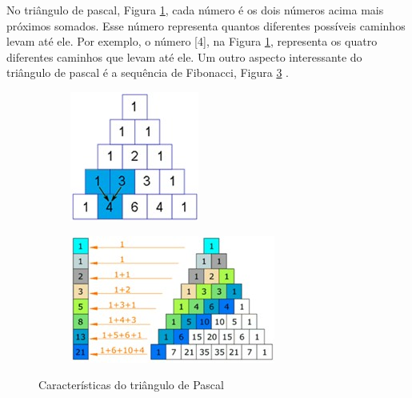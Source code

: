 No triângulo de pascal, Figura \ref{fig:pascal_triangle}, cada número é os dois números acima mais próximos somados. Esse número representa quantos diferentes possíveis caminhos levam até ele. Por exemplo, o número [4], na Figura \ref{fig:pascal_triangle}, representa os quatro diferentes caminhos que levam até ele. Um outro aspecto interessante do triângulo de pascal é a sequência de Fibonacci, Figura \ref{fig:pascal_triangle_fibonacci} \cite{mathisfun_pascal_triangle}.  

\begin{figure}[H]
\centering
	\begin{subfigure}[H]{0.47\linewidth}
	\centering
	\includegraphics[width=.55\linewidth]{sections/images/pascal_triangle.jpg}
	\caption{}
	\label{fig:pascal_triangle}
	\end{subfigure}
\hfill
	\begin{subfigure}[H]{0.47\linewidth}
	\centering
	\includegraphics[width=.9\linewidth]{sections/images/pascal_triangle_fibonacci.jpg}
	\caption{}
	\label{fig:pascal_triangle_fibonacci}
	\end{subfigure}%
\caption{Características do triângulo de Pascal}

\end{figure}


